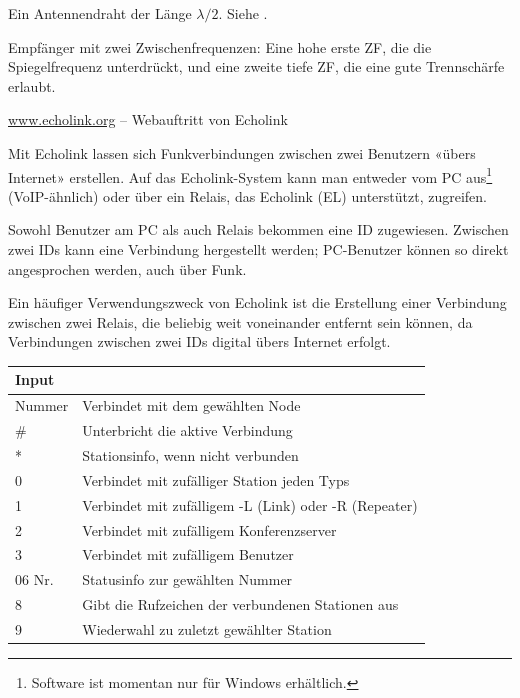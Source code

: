 {Ein Antennendraht der Länge $\lambda/2$. Siehe .}

{Empfänger mit zwei Zwischenfrequenzen: Eine hohe erste ZF, die die Spiegelfrequenz unterdrückt, und eine zweite tiefe ZF, die eine gute Trennschärfe erlaubt. }

{\href{http://www.echolink.org}{www.echolink.org} – Webauftritt von Echolink

Mit Echolink lassen sich Funkverbindungen zwischen zwei Benutzern «übers Internet» erstellen. Auf das Echolink-System kann man entweder vom PC aus\footnote{Software ist momentan nur für Windows erhältlich.} (VoIP-ähnlich) oder über ein Relais, das Echolink (EL) unterstützt, zugreifen. 

Sowohl Benutzer am PC als auch Relais bekommen eine ID zugewiesen. Zwischen zwei IDs kann eine Verbindung hergestellt werden; PC-Benutzer können so direkt angesprochen werden, auch über Funk.

Ein häufiger Verwendungszweck von Echolink ist die Erstellung einer Verbindung zwischen zwei Relais, die beliebig weit voneinander entfernt sein können, da Verbindungen zwischen zwei IDs digital übers Internet erfolgt.

\vspace{1em}
\begin{tabular}{ll}
\bfseries Input & \\ \toprule \arrayrulecolor{rowsep}
Nummer & Verbindet mit dem gewählten Node \\ \midrule
\# & Unterbricht die aktive Verbindung \\ \midrule
* & Stationsinfo, wenn nicht verbunden \\ \midrule
0 & Verbindet mit zufälliger Station jeden Typs \\ \midrule
1 & Verbindet mit zufälligem -L (Link) oder -R (Repeater) \\ \midrule
2 & Verbindet mit zufälligem Konferenzserver \\ \midrule
3 & Verbindet mit zufälligem Benutzer \\ \midrule
06 Nr. & Statusinfo zur gewählten Nummer \\ \midrule
8 & Gibt die Rufzeichen der verbundenen Stationen aus  \\ \midrule
9 & Wiederwahl zu zuletzt gewählter Station \\ \midrule
\end{tabular}
}


{}

